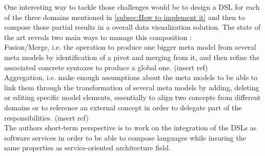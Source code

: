 \documentclass{acm_proc_article-sp}
\begin{document}
One interesting way to tackle those challenges would be to design a
DSL for each of the three domains mentioned in \ref{subsec:How to
  implement it} and then to compose those partial results in a overall
data visualization solution.
The state of the art reveals two main ways to manage this composition :\\
 Fusion/Merge, i.e. the operation to produce one bigger meta
model from several meta models by identification of a pivot and
merging from it, and
then refine the associated concrete syntaxes to produce a global one. (insert ref)\\
 Aggregation, i.e. make enough assumptions about the meta models to be able to link them through the transformation of several meta models by adding, deleting or editing specific model elements, essentially to align two concepts from different domains or to reference an external concept in order to delegate part of the responsibilities. (insert ref)\\
The authors short-term perspective is to work on the integration of
the DSLs as software services in order to be able to compose languages
while insuring the same properties as service-oriented architecture
field.




%
\end{document}
